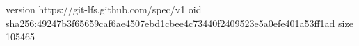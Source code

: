 version https://git-lfs.github.com/spec/v1
oid sha256:49247b3f65659caf6ae4507ebd1cbee4c73440f2409523e5a0efe401a53ff1ad
size 105465

